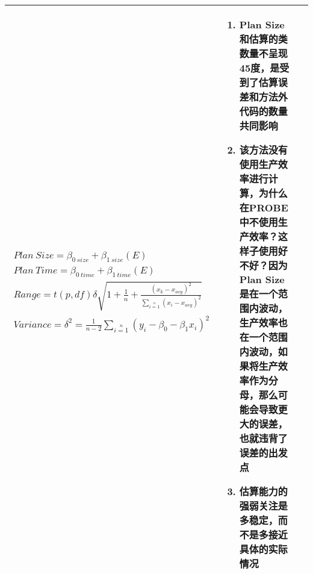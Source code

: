 \begin{spacing}{1.2}
\begin{longtable}{|m{1.5cm}<{\centering}|m{7cm}|m{6cm}|}
\begin{enumerate}[label=\arabic*.,leftmargin=1em]
$$\begin{array}{l}
            Plan\ Size = \beta_{0\ size} + \beta_{1\ size}(E) \\
            Plan\ Time = \beta_{0\ time} + \beta_{1\ time}(E) \\
            Range = t(p,df)\delta\sqrt{1 + \frac{1}{n} + \frac{(x_k-x_{avg})^2}{\sum\limits_{i=1}\limits^{n}(x_i-x_{avg})^2}} \\
            Variance = \delta^2 = \frac{1}{n-2}\sum\limits_{i=1}\limits^n(y_i - \beta_0 - \beta_1x_i)^2 \\
            \end{array}$$\vspace{-1.8em}
        \vspace{-1.3em}
        \end{enumerate}
        & \vspace{-1em}
        \begin{enumerate}[label=\arabic*.,leftmargin=1em]
            \item Plan Size和估算的类数量不呈现45度，是受到了估算误差和方法外代码的数量共同影响
            \item 该方法没有使用生产效率进行计算，为什么在PROBE中不使用生产效率？这样子使用好不好？因为Plan Size是在一个范围内波动，生产效率也在一个范围内波动，如果将生产效率作为分母，那么可能会导致更大的误差，也就违背了误差的出发点
            \item 估算能力的强弱关注是多稳定，而不是多接近具体的实际情况
            \vspace{-1.3em}
        \end{enumerate} \\ \hline
    \end{longtable}
	\end{spacing}
\vspace{-1em}